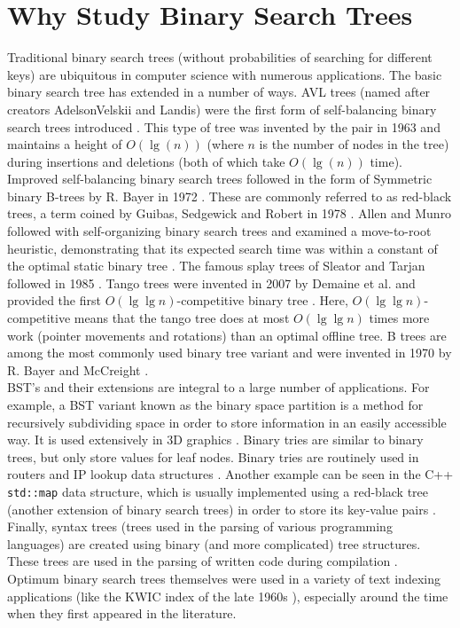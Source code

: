 \documentclass[letterpaper,12pt,titlepage,oneside,final]{book}
\theoremstyle{plain}
\begin{document}
\section{Why Study Binary Search Trees}

Traditional binary search trees (without probabilities of searching for different keys) are ubiquitous in computer science with numerous applications. The basic binary search tree has extended in a number of ways. AVL trees (named after creators AdelsonVelskii and Landis) were the first form of self-balancing binary search trees introduced \cite{adelsonvelskii1963algorithm}. This type of tree was invented by the pair in 1963 and maintains a height of $O(\lg(n))$ (where $n$ is the number of nodes in the tree) during insertions and deletions (both of which take $O(\lg(n))$ time). Improved self-balancing binary search trees followed in the form of Symmetric binary B-trees by R. Bayer in 1972 \cite{bayer1972symmetric}. These are commonly referred to as red-black trees, a term coined by Guibas, Sedgewick and Robert in 1978 \cite{guibas1978dichromatic}. Allen and Munro followed with self-organizing binary search trees and examined a move-to-root heuristic, demonstrating that its expected search time was within a constant of the optimal static binary tree \cite{allen1978self}. The famous splay trees of Sleator and Tarjan followed in 1985 \cite{sleator1985self}. Tango trees were invented in 2007 by Demaine et al. and provided the first $O(\lg \lg n)$-competitive binary tree \cite{demaine2007dynamic}. Here, $O(\lg \lg n)$-competitive means that the tango tree does at most $O(\lg \lg n)$ times more work (pointer movements and rotations) than an optimal offline tree. B trees are among the most commonly used binary tree variant and were invented in 1970 by R. Bayer and McCreight \cite{bayer1970organization}. \\

BST's and their extensions are integral to a large number of applications. For example, a BST variant known as the binary space partition is a method for recursively subdividing space in order to store information in an easily accessible way. It is used extensively in 3D graphics \cite{schumacker1969study, paterson1992optimal}. Binary tries are similar to binary trees, but only store values for leaf nodes. Binary tries are routinely used in routers and IP lookup data structures \cite{song2010building}. Another example can be seen in the C++ \texttt{std::map} data structure, which is usually implemented using a red-black tree (another extension of binary search trees) in order to store its key-value pairs \cite{CppMap}. Finally, syntax trees (trees used in the parsing of various programming languages) are created using binary (and more complicated) tree structures. These trees are used in the parsing of written code during compilation \cite{louden1997compiler}. Optimum binary search trees themselves were used in a variety of text indexing applications (like the KWIC index of the late 1960s \cite{helbich1969direct}), especially around the time when they first appeared in the literature.
\end{document}
